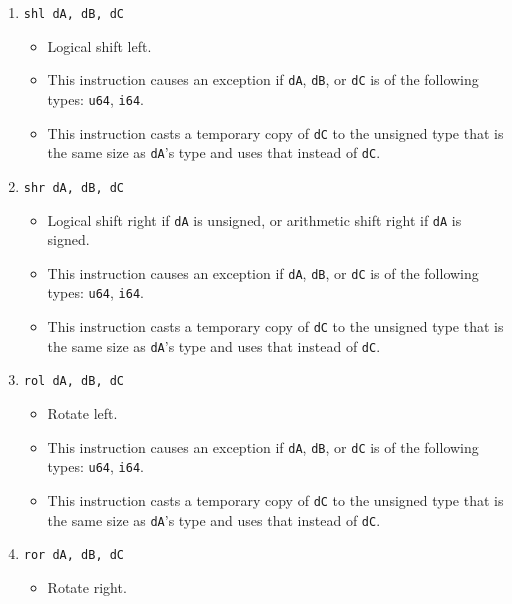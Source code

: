 \documentclass{article}
\begin{document}
\begin{itemize}
\begin{enumerate}
			\item \texttt{shl dA, dB, dC}
				\begin{itemize}
				\item Logical shift left.

				\item This instruction causes an exception if \texttt{dA},
				\texttt{dB}, or \texttt{dC} is of the following types:
				\texttt{u64}, \texttt{i64}.

				\item This instruction casts a temporary copy of
				\texttt{dC} to the unsigned type that is the same size as
				\texttt{dA}'s type and uses that instead of \texttt{dC}.
				\end{itemize}
			\item \texttt{shr dA, dB, dC}
				\begin{itemize}
				\item Logical shift right if \texttt{dA} is unsigned, or
				arithmetic shift right if \texttt{dA} is signed.

				\item This instruction causes an exception if \texttt{dA},
				\texttt{dB}, or \texttt{dC} is of the following types:
				\texttt{u64}, \texttt{i64}.

				\item This instruction casts a temporary copy of
				\texttt{dC} to the unsigned type that is the same size as
				\texttt{dA}'s type and uses that instead of \texttt{dC}.
				\end{itemize}
			\item \texttt{rol dA, dB, dC}
				\begin{itemize}
				\item Rotate left.

				\item This instruction causes an exception if \texttt{dA},
				\texttt{dB}, or \texttt{dC} is of the following types:
				\texttt{u64}, \texttt{i64}.

				\item This instruction casts a temporary copy of
				\texttt{dC} to the unsigned type that is the same size as
				\texttt{dA}'s type and uses that instead of \texttt{dC}.
				\end{itemize}
			\item \texttt{ror dA, dB, dC}
				\begin{itemize}
				\item Rotate right.


\end{itemize}
\end{enumerate}
\end{itemize}
\end{document}
